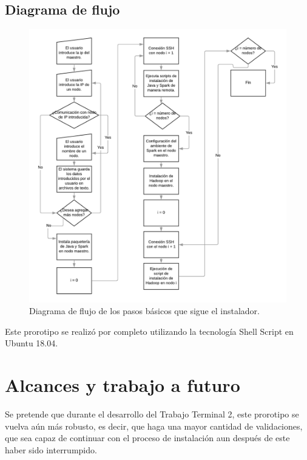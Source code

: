 \subsection{Diagrama de flujo}
\begin{figure}[H]
	\hypertarget{fig:diagramaFlujo}{\hspace{1pt}}
	\begin{center}
		\includegraphics{capitulo5/images/diagramaFlujo.png}
		\caption{Diagrama de flujo de los pasos básicos que sigue el instalador.}
	\end{center}
\end{figure}

Este prorotipo se realizó por completo utilizando la tecnología Shell Script en Ubuntu 18.04.

\section{Alcances y trabajo a futuro}
Se pretende que durante el desarrollo del Trabajo Terminal 2, este prorotipo se vuelva aún más robusto, es decir, que haga una mayor cantidad de validaciones, que sea capaz de continuar con el proceso de instalación aun después de este haber sido interrumpido. 